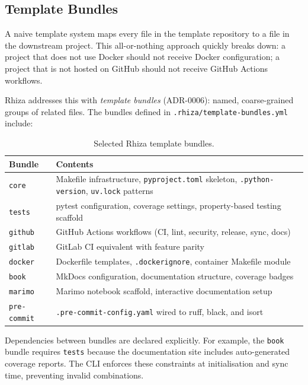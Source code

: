 \documentclass[12pt,a4paper]{article}
\begin{document}
\subsection{Template Bundles}
\label{sec:bundles}

A naive template system maps every file in the template repository to a file in the downstream project. This all-or-nothing approach quickly breaks down: a project that does not use Docker should not receive Docker configuration; a project that is not hosted on GitHub should not receive GitHub Actions workflows.

Rhiza addresses this with \emph{template bundles} (ADR-0006): named, coarse-grained groups of related files. The bundles defined in \texttt{.rhiza/template-bundles.yml} include:

\begin{table}[h]
\centering
\begin{tabular}{lp{9cm}}
\toprule
\textbf{Bundle} & \textbf{Contents} \\
\midrule
\texttt{core}   & Makefile infrastructure, \texttt{pyproject.toml} skeleton, \texttt{.python-version}, \texttt{uv.lock} patterns \\
\texttt{tests}  & pytest configuration, coverage settings, property-based testing scaffold \\
\texttt{github} & GitHub Actions workflows (CI, lint, security, release, sync, docs) \\
\texttt{gitlab} & GitLab CI equivalent with feature parity \\
\texttt{docker} & Dockerfile templates, \texttt{.dockerignore}, container Makefile module \\
\texttt{book}   & MkDocs configuration, documentation structure, coverage badges \\
\texttt{marimo} & Marimo notebook scaffold, interactive documentation setup \\
\texttt{pre-commit} & \texttt{.pre-commit-config.yaml} wired to ruff, black, and isort \\
\bottomrule
\end{tabular}
\caption{Selected Rhiza template bundles.}
\label{tab:bundles}
\end{table}

Dependencies between bundles are declared explicitly. For example, the \texttt{book} bundle requires \texttt{tests} because the documentation site includes auto-generated coverage reports. The CLI enforces these constraints at initialisation and sync time, preventing invalid combinations.
\end{document}
